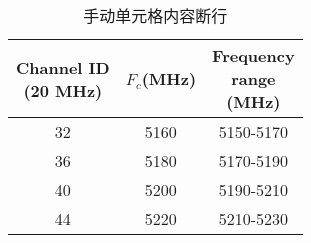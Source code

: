 \documentclass[UTF8,fontset=ubuntu]{ctexart}
\begin{document}
\begin{table}
\centering
\begin{tabular}{|c|c|c|}
    \hline
    \makecell{Channel ID\\(20 MHz)} & $F_c$(MHz) & \makecell{Frequency\\ range\\ (MHz)}\\
    \hline
    32 & 5160 & 5150-5170 \\
    \hline
    36 & 5180 & 5170-5190 \\
    \hline
    40 & 5200 & 5190-5210 \\
    \hline
    44 & 5220 & 5210-5230 \\
    \hline
\end{tabular}
\caption{手动单元格内容断行}
\end{table}
\end{document}
